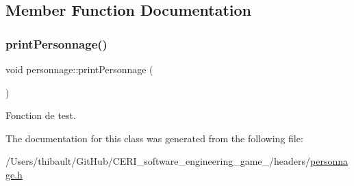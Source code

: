 \subsection{Member Function Documentation}
\mbox{\label{classpersonnage_a173f1b07d9098a96fd189ede2e7dad59}} 
\subsubsection{\texorpdfstring{print\+Personnage()}{printPersonnage()}}
{\footnotesize\ttfamily void personnage\+::print\+Personnage (\begin{DoxyParamCaption}{ }\end{DoxyParamCaption})}



Fonction de test. 



The documentation for this class was generated from the following file\+:\begin{DoxyCompactItemize}
\item 
/\+Users/thibault/\+Git\+Hub/\+C\+E\+R\+I\+\_\+software\+\_\+engineering\+\_\+game\+\_/headers/\hyperlink{personnage_8h}{personnage.\+h}\end{DoxyCompactItemize}
